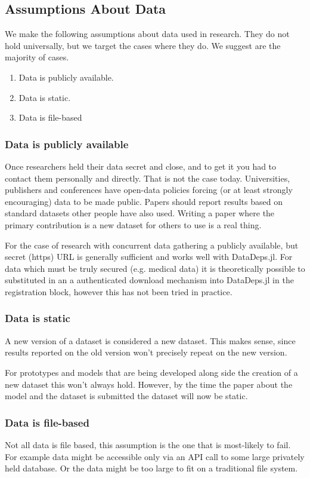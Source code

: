 \documentclass{jors}
\begin{document}
\subsection{Assumptions About Data}
We make the following assumptions about data used in research.
They do not hold universally, but we target the cases where they do.
We suggest are the majority of cases.


\begin{enumerate}
	\item Data is publicly available.
	\item Data is static.
	\item Data is file-based
\end{enumerate}

\subsubsection{Data is publicly available}
Once researchers held their data secret and close, and to get it you had to contact them personally and directly.
That is not the case today.
Universities, publishers and conferences have open-data policies forcing (or at least strongly encouraging) data to be made public.
Papers should report results based on standard datasets other people have also used.
Writing a paper where the primary contribution is a new dataset for others to use is a real thing.


For the case of research with concurrent data gathering a publicly available, but secret (https) URL is generally sufficient and works well with DataDeps.jl.
For data which must be truly secured (e.g. medical data) it is theoretically possible to substituted in an a authenticated  download mechanism into DataDeps.jl in the registration block, however this has not been tried in practice.


\subsubsection{Data is static}
A new version of a dataset is considered a new dataset.
This makes sense, since results reported on the old version won't precisely repeat on the new version.

For prototypes and models that are being developed along side the creation of a new dataset this won't always hold.
However, by the time the paper about the model and the dataset is submitted the dataset will now be static.

\subsubsection{Data is file-based}
Not all data is file based, this assumption is the one that is most-likely to fail.
For example data might be accessible only via an API call to some large privately held database.
Or the data might be too large to fit on a traditional file system.
\end{document}
